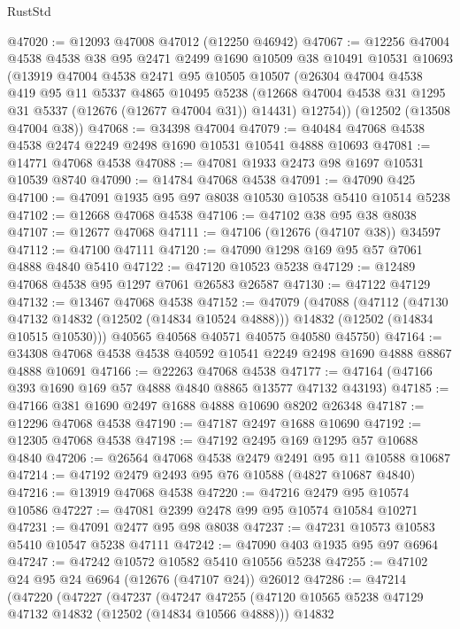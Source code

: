 \begin{lexlean}{RustStd}
\begin{coremodule}
@47020 := @12093 @47008 @47012 (@12250 @46942)
@47067 := @12256
    @47004
    @4538
    @4538
    @38
    @95
    @2471
    @2499
    @1690
    @10509
    @38
    @10491
    @10531
    @10693
    (@13919
      @47004
      @4538
      @2471
      @95
      @10505
      @10507
      (@26304
        @47004
        @4538
        @419
        @95
        @11
        @5337
        @4865
        @10495
        @5238
        (@12668 @47004 @4538 @31 @1295 @31 @5337 (@12676 (@12677 @47004 @31)) @14431)
        @12754))
    (@12502 (@13508 @47004 @38))
@47068 := @34398 @47004
@47079 := @40484 @47068 @4538 @4538 @2474 @2249 @2498 @1690 @10531 @10541 @4888 @10693
@47081 := @14771 @47068 @4538
@47088 := @47081 @1933 @2473 @98 @1697 @10531 @10539 @8740
@47090 := @14784 @47068 @4538
@47091 := @47090 @425
@47100 := @47091 @1935 @95 @97 @8038 @10530 @10538 @5410 @10514 @5238
@47102 := @12668 @47068 @4538
@47106 := @47102 @38 @95 @38 @8038
@47107 := @12677 @47068
@47111 := @47106 (@12676 (@47107 @38)) @34597
@47112 := @47100 @47111
@47120 := @47090 @1298 @169 @95 @57 @7061 @4888 @4840 @5410
@47122 := @47120 @10523 @5238
@47129 := @12489 @47068 @4538 @95 @1297 @7061 @26583 @26587
@47130 := @47122 @47129
@47132 := @13467 @47068 @4538
@47152 := @47079
    (@47088
      (@47112
        (@47130 @47132 @14832 (@12502 (@14834 @10524 @4888)))
        @14832
        (@12502 (@14834 @10515 @10530)))
      @40565
      @40568
      @40571
      @40575
      @40580
      @45750)
@47164 := @34308 @47068 @4538 @4538 @40592 @10541 @2249 @2498 @1690 @4888 @8867 @4888 @10691
@47166 := @22263 @47068 @4538
@47177 := @47164 (@47166 @393 @1690 @169 @57 @4888 @4840 @8865 @13577 @47132 @43193)
@47185 := @47166 @381 @1690 @2497 @1688 @4888 @10690 @8202 @26348
@47187 := @12296 @47068 @4538
@47190 := @47187 @2497 @1688 @10690
@47192 := @12305 @47068 @4538
@47198 := @47192 @2495 @169 @1295 @57 @10688 @4840
@47206 := @26564 @47068 @4538 @2479 @2491 @95 @11 @10588 @10687
@47214 := @47192 @2479 @2493 @95 @76 @10588 (@4827 @10687 @4840)
@47216 := @13919 @47068 @4538
@47220 := @47216 @2479 @95 @10574 @10586
@47227 := @47081 @2399 @2478 @99 @95 @10574 @10584 @10271
@47231 := @47091 @2477 @95 @98 @8038
@47237 := @47231 @10573 @10583 @5410 @10547 @5238 @47111
@47242 := @47090 @403 @1935 @95 @97 @6964
@47247 := @47242 @10572 @10582 @5410 @10556 @5238
@47255 := @47102 @24 @95 @24 @6964 (@12676 (@47107 @24)) @26012
@47286 := @47214
    (@47220
      (@47227
        (@47237
          (@47247
            @47255
            (@47120 @10565 @5238 @47129 @47132 @14832 (@12502 (@14834 @10566 @4888)))
            @14832

\end{coremodule}
\end{lexlean}
